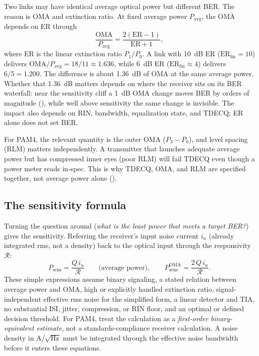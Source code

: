 Two links may have identical average optical power but different BER. The reason
is OMA and extinction ratio. At fixed average power $P_\mathrm{avg}$, the OMA
depends on ER through
\[
  \frac{\mathrm{OMA}}{P_\mathrm{avg}}
  = \frac{2(\mathrm{ER}-1)}{\mathrm{ER}+1},
\]
where ER is the linear extinction ratio $P_1/P_0$. A link with 10~dB ER
($\mathrm{ER}_\mathrm{lin}=10$) delivers
$\mathrm{OMA}/P_\mathrm{avg} = 18/11 \approx 1.636$, while 6~dB ER
($\mathrm{ER}_\mathrm{lin}\approx 4$) delivers $6/5 = 1.200$. The difference is
about 1.36~dB of OMA at the same average power. Whether that 1.36~dB matters
depends on where the receiver sits on its BER waterfall: near the sensitivity
cliff a 1~dB OMA change moves BER by orders of magnitude
(), while well above sensitivity the same change is
invisible. The impact also depends on RIN, bandwidth, equalization state, and
TDECQ; ER alone does not set BER.

For PAM4, the relevant quantity is the outer OMA ($P_3 - P_0$), and level spacing
(RLM) matters independently. A transmitter that launches adequate average power but
has compressed inner eyes (poor RLM) will fail TDECQ even though a power meter
reads in-spec. This is why TDECQ, OMA, and RLM are specified together, not average
power alone ().

\subsection{The sensitivity formula}

Turning the question around (\emph{what is the least power that meets a target
BER?}) gives the sensitivity. Referring the receiver's input noise current
$i_n$ (already integrated rms, not a density) back to the optical input through
the responsivity $\mathcal{R}$:
\[
  P_{\text{sens}} = \frac{Q\,i_n}{\mathcal{R}}
  \qquad\text{(average power)},\qquad
  P_{\text{sens}}^{\text{OMA}} = \frac{2\,Q\,i_n}{\mathcal{R}}.
\]
These simple expressions assume binary signaling, a stated relation between
average power and OMA, high or explicitly handled extinction ratio,
signal-independent effective rms noise for the simplified form, a linear
detector and TIA, no substantial ISI, jitter, compression, or RIN floor, and an
optimal or defined decision threshold. For PAM4, treat the calculation as a
\emph{first-order binary-equivalent estimate}, not a standards-compliance
receiver calculation. A noise density in A/$\sqrt{\mathrm{Hz}}$ must be
integrated through the effective noise bandwidth before it enters these
equations.

